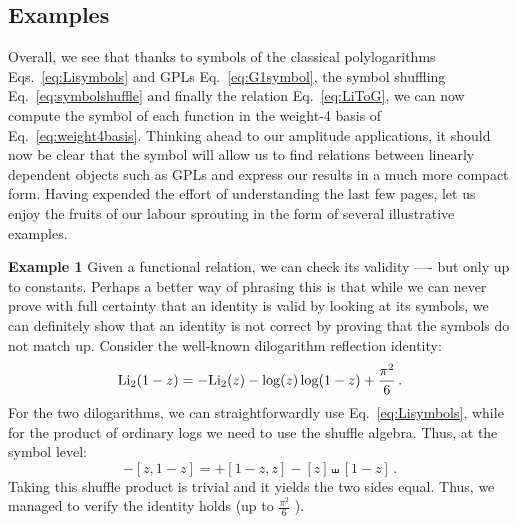 \documentclass[main.tex]{subfiles}
\begin{document}
\subsection{Examples}
Overall, we see that thanks to symbols of the classical polylogarithms Eqs.~\ref{eq:Lisymbols} and GPLs Eq.~\ref{eq:G1symbol}, the symbol shuffling Eq.~\ref{eq:symbolshuffle} and finally the relation Eq.~\ref{eq:LiToG}, we can now compute the symbol of each function in the weight-4 basis of Eq.~\ref{eq:weight4basis}. Thinking ahead to our amplitude applications, it should now be clear that the symbol will allow us to find relations between linearly dependent objects such as GPLs and express our results in a much more compact form. Having expended the effort of understanding the last few pages, let us enjoy the fruits of our labour sprouting in the form of several illustrative examples.

\textbf{Example 1} \newline
Given a functional relation, we can check its validity ---- but only up to constants. Perhaps a better way of phrasing this is that while we can never prove with full certainty that an identity is valid by looking at its symbols, we can definitely show that an identity is not correct by proving that the symbols do not match up. Consider the well-known dilogarithm reflection identity:
\begin{equation}
    \text{Li}_2(1-z) =- \text{Li}_2(z) -\log(z) \log(1-z) + \frac{\pi^2}{6} \,.
\end{equation}
For the two dilogarithms, we can straightforwardly use Eq.~\ref{eq:Lisymbols}, while for the product of ordinary logs we need to use the shuffle algebra. Thus, at the symbol level:
\begin{equation}
    -[z,1-z] = + [1-z,z] - [z] \shuffle [1-z]\,.
\end{equation}
Taking this shuffle product is trivial and it yields the two sides equal. Thus, we managed to verify the identity holds (up to $\frac{\pi^2}{6}$ ).
\end{document}
